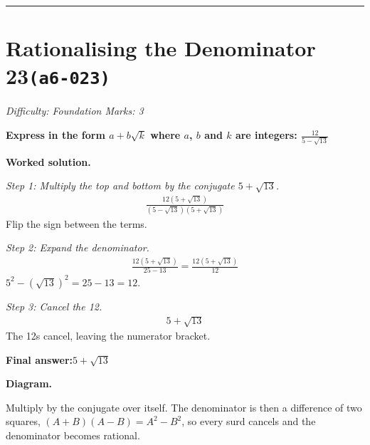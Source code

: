 \documentclass[11pt]{article}
\newcommand{\question}[1]{\par\medskip\noindent\textbf{#1}\par}
\begin{document}
\medskip\hrule

\section*{Rationalising the Denominator 23\quad\small\texttt{(a6-023)}}
\textit{Difficulty: Foundation \quad\textbar\quad Marks: 3}

\question{Express in the form \( a + b\sqrt{k} \) where \( a \), \( b \) and \( k \) are integers: \( \frac{12}{5 - \sqrt{13}} \)}

\textbf{Worked solution.}

\textit{Step 1: Multiply the top and bottom by the conjugate \( 5 + \sqrt{13} \).}
\[\begin{gathered}
\frac{12(5 + \sqrt{13})}{(5 - \sqrt{13})(5 + \sqrt{13})}
\end{gathered}\]
Flip the sign between the terms.

\textit{Step 2: Expand the denominator.}
\[\begin{gathered}
\frac{12(5 + \sqrt{13})}{25 - 13} = \frac{12(5 + \sqrt{13})}{12}
\end{gathered}\]
\( 5^2 - (\sqrt{13})^2 = 25 - 13 = 12 \).

\textit{Step 3: Cancel the 12.}
\[\begin{gathered}
5 + \sqrt{13}
\end{gathered}\]
The 12s cancel, leaving the numerator bracket.

\begin{answerbox}
\textbf{Final answer:}\quad \(\displaystyle 5 + \sqrt{13}\)
\end{answerbox}
\textbf{Diagram.}

\begin{center}
\end{center}
\small Multiply by the conjugate over itself. The denominator is then a difference of two squares, $(A+B)(A-B)=A^{2}-B^{2}$, so every surd cancels and the denominator becomes rational.\normalsize
\end{document}
